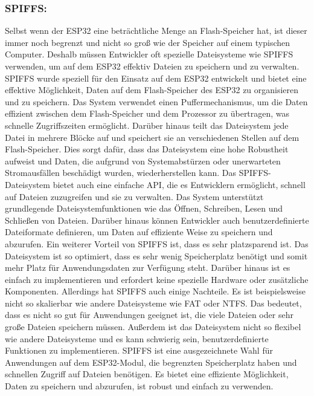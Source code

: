 \subsubsection*{SPIFFS:}
Selbst wenn der ESP32 eine beträchtliche Menge an Flash-Speicher hat, ist dieser immer noch begrenzt und nicht so groß wie der Speicher auf einem typischen Computer. 
Deshalb müssen Entwickler oft spezielle Dateisysteme wie SPIFFS verwenden, um auf dem ESP32 effektiv Dateien zu speichern und zu verwalten.
SPIFFS wurde speziell für den Einsatz auf dem ESP32 entwickelt und bietet eine effektive Möglichkeit, Daten auf dem Flash-Speicher des ESP32 zu organisieren und zu speichern. 
Das System verwendet einen Puffermechanismus, um die Daten effizient zwischen dem Flash-Speicher und dem Prozessor zu übertragen, was schnelle Zugriffszeiten ermöglicht. 
Darüber hinaus teilt das Dateisystem jede Datei in mehrere Blöcke auf und speichert sie an verschiedenen Stellen auf dem Flash-Speicher. 
Dies sorgt dafür, dass das Dateisystem eine hohe Robustheit aufweist und Daten, die aufgrund von Systemabstürzen oder unerwarteten Stromausfällen beschädigt wurden, wiederherstellen kann.
Das SPIFFS-Dateisystem bietet auch eine einfache API, die es Entwicklern ermöglicht, schnell auf Dateien zuzugreifen und sie zu verwalten. 
Das System unterstützt grundlegende Dateisystemfunktionen wie das Öffnen, Schreiben, Lesen und Schließen von Dateien. 
Darüber hinaus können Entwickler auch benutzerdefinierte Dateiformate definieren, um Daten auf effiziente Weise zu speichern und abzurufen.
Ein weiterer Vorteil von SPIFFS ist, dass es sehr platzsparend ist. 
Das Dateisystem ist so optimiert, dass es sehr wenig Speicherplatz benötigt und somit mehr Platz für Anwendungsdaten zur Verfügung steht. 
Darüber hinaus ist es einfach zu implementieren und erfordert keine spezielle Hardware oder zusätzliche Komponenten.
Allerdings hat SPIFFS auch einige Nachteile. Es ist beispielsweise nicht so skalierbar wie andere Dateisysteme wie FAT oder NTFS. 
Das bedeutet, dass es nicht so gut für Anwendungen geeignet ist, die viele Dateien oder sehr große Dateien speichern müssen. 
Außerdem ist das Dateisystem nicht so flexibel wie andere Dateisysteme und es kann schwierig sein, benutzerdefinierte Funktionen zu implementieren.
SPIFFS ist eine ausgezeichnete Wahl für Anwendungen auf dem ESP32-Modul, die begrenzten Speicherplatz haben und schnellen Zugriff auf Dateien benötigen. 
Es bietet eine effiziente Möglichkeit, Daten zu speichern und abzurufen, ist robust und einfach zu verwenden.
\cite{SPIFFS}












